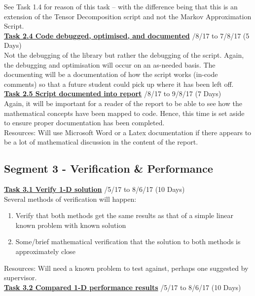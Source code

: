 \documentclass[11pt,draftd]{article}
\begin{document}
\begin{appendices}
	\noindent See Task 1.4 for reason of this task – with the difference being that this is an extension of the Tensor Decomposition script and not the Markov Approximation Script.\\
	
	\noindent\underline{\textbf{Task 2.4 Code debugged, optimised, and documented}} /8/17 to 7/8/17 (5 Days) \\
	
	\noindent Not the debugging of the library but rather the debugging of the script. Again, the debugging and optimisation will occur on an as-needed basis. The documenting will be a documentation of how the script works (in-code comments) so that a future student could pick up where it has been left off.\\
	
	\noindent\underline{\textbf{Task 2.5 Script documented into report}} /8/17 to 9/8/17 (7 Days) \\
	
	\noindent Again, it will be important for a reader of the report to be able to see how the mathematical concepts have been mapped to code. Hence, this time is set aside to ensure proper documentation has been completed. \\
	Resources: Will use Microsoft Word or a Latex documentation if there appears to be a lot of mathematical discussion in the content of the report.
	
	
	\subsection{Segment 3 - Verification \& Performance}
	\underline{\textbf{Task 3.1 Verify 1-D solution}} /5/17 to 8/6/17 (10 Days) \\
	
	\noindent Several methods of verification will happen:
	\begin{enumerate}
		\item Verify that both methods get the same results as that of a simple linear known problem with known solution
		\item Some/brief mathematical verification that the solution to both methods is approximately close
	\end{enumerate}
	Resources: Will need a known problem to test against, perhaps one suggested by supervisor.\\
	
	\noindent\underline{\textbf{Task 3.2 Compared 1-D performance results}} /5/17 to 8/6/17 (10 Days) \\
	

\end{appendices}
\end{document}
